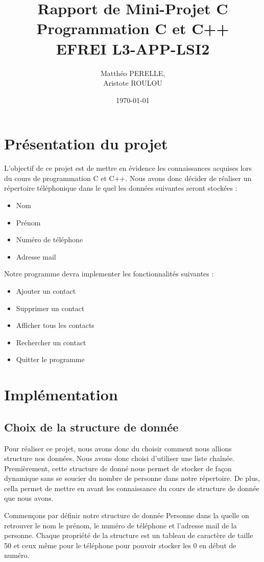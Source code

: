 \documentclass[12pt]{report}
\title{%
  Rapport de Mini-Projet C \\
  \large Programmation C et C++ \\
    EFREI L3-APP-LSI2}
\author{Matthéo PERELLE, \\ Aristote ROULOU}
\date{\today}
\begin{document}
\maketitle
\tableofcontents

\chapter{Présentation du projet}
L'objectif de ce projet est de mettre en évidence les connaissances acquises lors du cours de programmation C et C++.
Nous avons donc décider de réaliser un répertoire téléphonique dans le quel les données suivantes seront stockées :
\begin{itemize}
    \item Nom
    \item Prénom
    \item Numéro de téléphone
    \item Adresse mail
\end{itemize}

Notre programme devra implementer les fonctionnalités suivantes :
\begin{itemize}
    \item Ajouter un contact
    \item Supprimer un contact
    \item Afficher tous les contacts
    \item Rechercher un contact
    \item Quitter le programme
\end{itemize}

\chapter{Implémentation}
\section{Choix de la structure de donnée}
Pour réaliser ce projet, nous avons donc du choisir comment nous allions structure nos données. Nous avons donc choisi d'utiliser une liste chaînée. Premièrement, cette structure de donné nous permet de stocker de façon dynamique sans se soucier du nombre de personne dans notre répertoire. De plus, cella permet de mettre en avant les connaissance du cours de structure de donnée que nous avons. 

Commençons par définir notre structure de donnée Personne dans la quelle on retrouver le nom le prénom, le numéro de téléphone et l'adresse mail de la personne.
Chaque propriété de la structure est un tableau de caractère de taille 50 et ceux même pour le téléphone pour pouvoir stocker les 0 en début de numéro.
\end{document}
